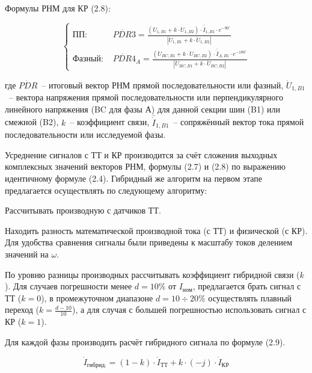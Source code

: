 
Формулы РНМ для КР (2.8):

\begin{equation}
\label{eq:ch02_pdr_kr}
\left\{
\begin{aligned}
\text{ПП: } & \dot{PDR3} = \frac{(\dot{U}_{1,B1} + k \cdot \dot{U}_{1,B2}) \cdot \bar{\dot{I}}_{1,B1} \cdot e^{-90^\circ}}{|\dot{U}_{1,B1} + k \cdot \dot{U}_{1,B2}|} \\
\text{Фазный: } & \dot{PDR4}_A = \frac{(\dot{U}_{BC,B1} + k \cdot \dot{U}_{BC,B2}) \cdot \bar{\dot{I}}_{A,B1} \cdot e^{-180^\circ}}{|\dot{U}_{BC,B1} + k \cdot \dot{U}_{BC,B2}|}
\end{aligned}
\right.
\end{equation}


где $\dot{PDR}$~-- итоговый вектор РНМ прямой последовательности или фазный, $\dot{U}_{1,B1}$~-- вектора напряжения прямой последовательности или перпендикулярного линейного напряжения (BC для фазы А) для данной секции шин (B1) или смежной (B2), $k$~-- коэффициент связи, $\bar{\dot{I}}_{1,B1}$~-- сопряжённый вектор тока прямой последовательности или исследуемой фазы.

Усреднение сигналов с ТТ и КР производится за счёт сложения выходных комплексных значений векторов РНМ, формулы (2.7) и (2.8) по выражению идентичному формуле (2.4). Гибридный же алгоритм на первом этапе предлагается осуществлять по следующему алгоритму:

Рассчитывать производную с датчиков ТТ.

Находить разность математической производной тока (с ТТ) и физической (с КР). Для удобства сравнения сигналы были приведены к масштабу токов делением значений на $\omega$.

По уровню разницы производных рассчитывать коэффициент гибридной связи ($k$). Для случаев погрешности менее $d = 10\%$ от $I_{\text{ном}}$, предлагается брать сигнал с ТТ ($k = 0$), в промежуточном диапазоне $d = 10 \div 20\%$ осуществлять плавный переход ($k = \frac{d-10}{10}$), а для случая с большей погрешностью использовать сигнал с КР ($k = 1$). 

Для каждой фазы производить расчёт гибридного сигнала по формуле (2.9).

\begin{equation}
\label{eq:ch02_hybrid_signal}
\dot{I}_{\text{гибрид.}} = (1 - k) \cdot \dot{I}_{\text{ТТ}} + k \cdot (-j) \cdot \dot{I}_{\text{КР}}
\end{equation}

